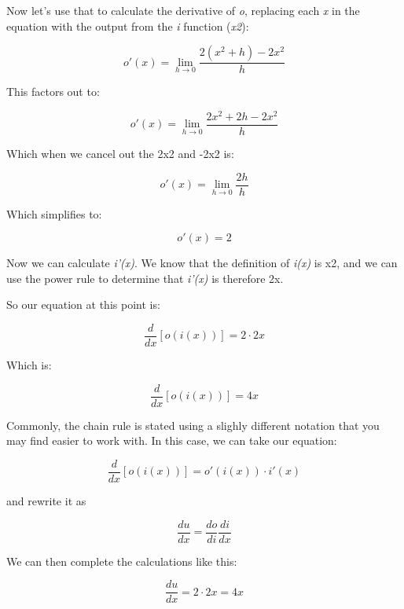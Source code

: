 \documentclass[11pt]{article}
\begin{document}
Now let's use that to calculate the derivative of \emph{o}, replacing
each \emph{x} in the equation with the output from the \emph{i} function
(\emph{x2}):

\begin{equation}o'(x) = \lim_{h \to 0} \frac{2(x^{2} + h) - 2x^{2}}{h} \end{equation}

This factors out to:

\begin{equation}o'(x) = \lim_{h \to 0} \frac{2x^{2} + 2h - 2x^{2}}{h} \end{equation}

Which when we cancel out the 2x2 and -2x2 is:

\begin{equation}o'(x) = \lim_{h \to 0} \frac{2h}{h} \end{equation}

Which simplifies to:

\begin{equation}o'(x) = 2 \end{equation}

Now we can calculate \emph{i'(x)}. We know that the definition of
\emph{i(x)} is x2, and we can use the power rule to determine that
\emph{i'(x)} is therefore 2x.

So our equation at this point is:

\begin{equation}\frac{d}{dx}[o(i(x))] = 2 \cdot 2x\end{equation}

Which is:

\begin{equation}\frac{d}{dx}[o(i(x))] = 4x\end{equation}

Commonly, the chain rule is stated using a slighly different notation
that you may find easier to work with. In this case, we can take our
equation:

\begin{equation}\frac{d}{dx}[o(i(x))] = o'(i(x)) \cdot i'(x)\end{equation}

and rewrite it as

\begin{equation}\frac{du}{dx} = \frac{do}{di}\frac{di}{dx}\end{equation}

We can then complete the calculations like this:

\begin{equation}\frac{du}{dx} = 2 \cdot 2x = 4x\end{equation}


    
    
    
    
\end{document}
